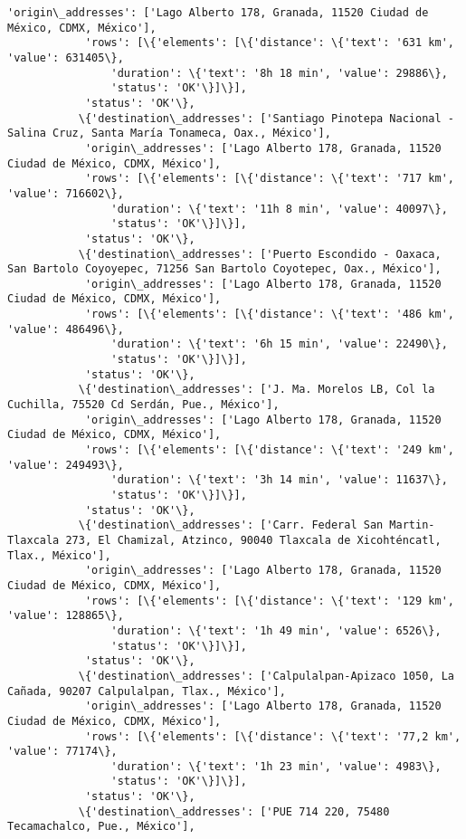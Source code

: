 \documentclass[11pt]{article}
\begin{document}
\begin{Verbatim}[commandchars=\\\{\}]
            'origin\_addresses': ['Lago Alberto 178, Granada, 11520 Ciudad de México, CDMX, México'],
            'rows': [\{'elements': [\{'distance': \{'text': '631 km', 'value': 631405\},
                'duration': \{'text': '8h 18 min', 'value': 29886\},
                'status': 'OK'\}]\}],
            'status': 'OK'\},
           \{'destination\_addresses': ['Santiago Pinotepa Nacional - Salina Cruz, Santa María Tonameca, Oax., México'],
            'origin\_addresses': ['Lago Alberto 178, Granada, 11520 Ciudad de México, CDMX, México'],
            'rows': [\{'elements': [\{'distance': \{'text': '717 km', 'value': 716602\},
                'duration': \{'text': '11h 8 min', 'value': 40097\},
                'status': 'OK'\}]\}],
            'status': 'OK'\},
           \{'destination\_addresses': ['Puerto Escondido - Oaxaca, San Bartolo Coyoyepec, 71256 San Bartolo Coyotepec, Oax., México'],
            'origin\_addresses': ['Lago Alberto 178, Granada, 11520 Ciudad de México, CDMX, México'],
            'rows': [\{'elements': [\{'distance': \{'text': '486 km', 'value': 486496\},
                'duration': \{'text': '6h 15 min', 'value': 22490\},
                'status': 'OK'\}]\}],
            'status': 'OK'\},
           \{'destination\_addresses': ['J. Ma. Morelos LB, Col la Cuchilla, 75520 Cd Serdán, Pue., México'],
            'origin\_addresses': ['Lago Alberto 178, Granada, 11520 Ciudad de México, CDMX, México'],
            'rows': [\{'elements': [\{'distance': \{'text': '249 km', 'value': 249493\},
                'duration': \{'text': '3h 14 min', 'value': 11637\},
                'status': 'OK'\}]\}],
            'status': 'OK'\},
           \{'destination\_addresses': ['Carr. Federal San Martin-Tlaxcala 273, El Chamizal, Atzinco, 90040 Tlaxcala de Xicohténcatl, Tlax., México'],
            'origin\_addresses': ['Lago Alberto 178, Granada, 11520 Ciudad de México, CDMX, México'],
            'rows': [\{'elements': [\{'distance': \{'text': '129 km', 'value': 128865\},
                'duration': \{'text': '1h 49 min', 'value': 6526\},
                'status': 'OK'\}]\}],
            'status': 'OK'\},
           \{'destination\_addresses': ['Calpulalpan-Apizaco 1050, La Cañada, 90207 Calpulalpan, Tlax., México'],
            'origin\_addresses': ['Lago Alberto 178, Granada, 11520 Ciudad de México, CDMX, México'],
            'rows': [\{'elements': [\{'distance': \{'text': '77,2 km', 'value': 77174\},
                'duration': \{'text': '1h 23 min', 'value': 4983\},
                'status': 'OK'\}]\}],
            'status': 'OK'\},
           \{'destination\_addresses': ['PUE 714 220, 75480 Tecamachalco, Pue., México'],

\end{Verbatim}
\end{document}
